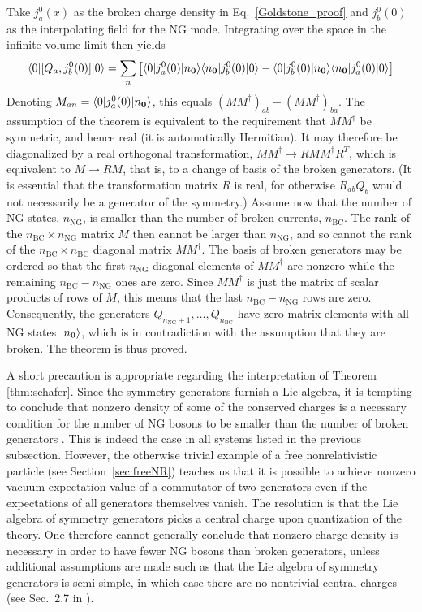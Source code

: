\documentclass[final,2p,times,12pt,sort&compress]{elsarticle}
\newcommand\vek[1]{{\boldsymbol{\bf #1}}}   %
\newcommand\bra[1]{\langle#1\vert}          %
\newcommand\ket[1]{\vert#1\rangle}          %
\newcommand\he[1]{#1^{\dagger}}             %
\begin{document}
Take $j^0_a(x)$ as the broken charge density in Eq.~\eqref{Goldstone_proof} and
$j^0_b(0)$ as the interpolating field for the NG mode. Integrating over the
space in the infinite volume limit then yields
\begin{equation}
\bra0[Q_a,j^0_b(0)]\ket0=\sum_n\left[
\bra0j^0_a(0)\ket{n_{\vek0}}\bra{n_{\vek0}}j^0_b(0)\ket0-
\bra0j^0_b(0)\ket{n_{\vek0}}\bra{n_{\vek0}}j^0_a(0)\ket0
\right]
\label{currentOP}
\end{equation}
Denoting $M_{an}=\bra0j^0_a(0)\ket{n_{\vek0}}$, this equals $(M\he M)_{ab}-(M\he
M)_{ba}$. The assumption of the theorem is equivalent to the requirement that
$M\he M$ be symmetric, and hence real (it is automatically Hermitian). It may
therefore be diagonalized by a real orthogonal transformation, $M\he M\to RM\he
MR^T$, which is equivalent to $M\to RM$, that is, to a change of basis of the
broken generators. (It is essential that the transformation matrix $R$ is real,
for otherwise $R_{ab}Q_b$ would not necessarily be a generator of the symmetry.)
Assume now that the number of NG states, $n_{\text{NG}}$, is smaller than the
number of broken currents, $n_{\text{BC}}$. The rank of the
$n_{\text{BC}}\times n_{\text{NG}}$ matrix $M$ then cannot be larger than
$n_{\text{NG}}$, and so cannot the rank of the $n_{\text{BC}}\times
n_{\text{BC}}$ diagonal matrix $M\he M$. The basis of broken generators may be
ordered so that the first $n_{\text{NG}}$ diagonal elements of $M\he M$ are
nonzero while the remaining $n_{\text{BC}}-n_{\text{NG}}$ ones are zero. Since
$M\he M$ is just the matrix of scalar products of rows of $M$, this means that
the last $n_{\text{BC}}-n_{\text{NG}}$ rows are zero. Consequently, the
generators $Q_{n_{\text{NG}}+1},\dotsc, Q_{n_{\text{BC}}}$ have zero matrix
elements with all NG states $\ket{n_{\vek0}}$, which is in contradiction with
the assumption that they are broken. The theorem is thus proved.

A short precaution is appropriate regarding the interpretation of Theorem
\ref{thm:schafer}. Since the symmetry generators furnish a Lie algebra, it is
tempting to conclude that nonzero density of some of the conserved charges is a
necessary condition for the number of NG bosons to be smaller than the number
of broken generators \cite{Schafer:2001bq,Brauner:2005di}. This is indeed the
case in all systems listed in the previous subsection. However, the
otherwise trivial example of a free nonrelativistic particle (see
Section~\ref{sec:freeNR}) teaches us that it is possible to achieve nonzero
vacuum expectation value of a commutator of two generators even if the
expectations of all generators themselves vanish. The resolution is that the Lie
algebra of symmetry generators picks a central charge upon quantization of the
theory. One therefore cannot generally conclude that nonzero charge density is
necessary in order to have fewer NG bosons than broken generators, unless
additional assumptions are made such as that the Lie algebra of symmetry
generators is semi-simple, in which case there are no nontrivial central charges
(see Sec.~2.7 in \cite{Weinberg:1995v1}).
\end{document}
